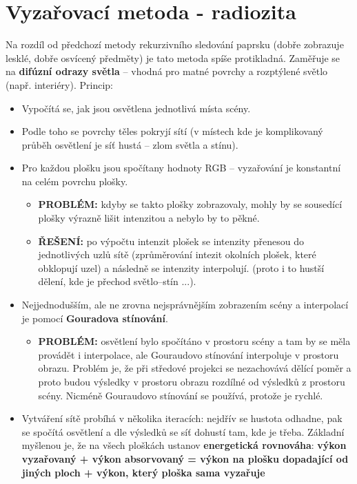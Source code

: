 \section{Vyzařovací metoda - radiozita}
Na rozdíl od předchozí metody rekurzivního sledování paprsku (dobře zobrazuje lesklé, dobře osvícený předměty) je tato metoda spíše protikladná. Zaměřuje se na \textbf{difúzní odrazy světla} -- vhodná pro matné povrchy a rozptýlené světlo (např. interiéry). Princip:
\begin{itemize}
    \item Vypočítá se, jak jsou osvětlena jednotlivá místa scény.
    \item Podle toho se povrchy těles pokryjí sítí (v místech kde je komplikovaný průběh osvětlení je síť hustá -- zlom světla a stínu).
    \item Pro každou plošku jsou spočítany hodnoty RGB -- vyzařování je konstantní na celém povrchu plošky.
          \begin{itemize}
              \item \textbf{PROBLÉM:} kdyby se takto plošky zobrazovaly, mohly by se sousedící plošky výrazně lišit intenzitou a nebylo by to pěkné.
              \item   \textbf{ŘEŠENÍ:} po výpočtu intenzit plošek se intenzity přenesou do jednotlivých uzlů sítě (zprůměrování intezit okolních plošek, které obklopují uzel) a následně se intenzity interpolují. (proto i to hustší dělení, kde je přechod světlo--stín ...).
          \end{itemize}
    \item Nejjednodušším, ale ne zrovna nejsprávnějším zobrazením scény a interpolací je pomocí \textbf{Gouradova stínování}.
          \begin{itemize}
              \item   \textbf{PROBLÉM:} osvětlení bylo spočítáno v prostoru scény a tam by se měla provádět i interpolace, ale Gouraudovo stínování interpoluje v prostoru obrazu. Problém je, že při středové projekci se nezachovává dělící poměr a proto budou výsledky v prostoru obrazu rozdílné od výsledků z prostoru scény. Nicméně Gouraudovo stínování se používá, protože je rychlé.
          \end{itemize}
    \item Vytváření sítě probíhá v několika iteracích: nejdřív se hustota odhadne, pak se spočítá osvětlení a dle výsledků se síť dohustí tam, kde je třeba. Základní myšlenou je, že na všech ploškách ustanov \textbf{energetická rovnováha}: \textbf{ výkon vyzařovaný + výkon absorvovaný = výkon na plošku dopadající od jiných ploch + výkon, který ploška sama vyzařuje}
\end{itemize}
